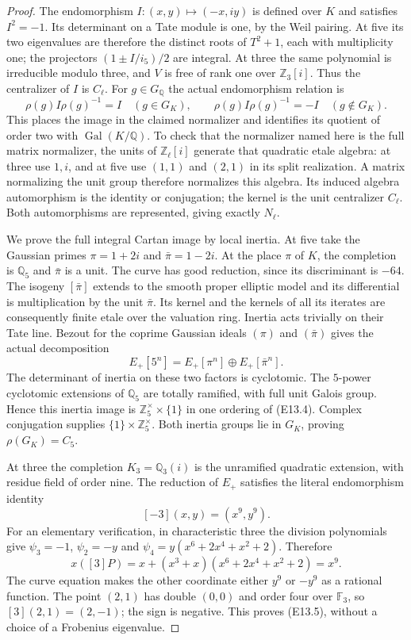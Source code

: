\begin{proof}
The endomorphism $I:(x,y)\mapsto(-x,iy)$ is defined over $K$
and satisfies $I^2=-1$.  Its determinant on a Tate module is one,
by the Weil pairing.  At five its two eigenvalues are therefore
the distinct roots of $T^2+1$, each with multiplicity one; the
projectors $(1\pm I/i_5)/2$ are integral.  At three the same
polynomial is irreducible modulo three, and $V$ is free of rank
one over $\mathbb Z_3[i]$.  Thus the centralizer of $I$ is $C_\ell$.
For $g\in G_{\mathbb Q}$ the actual endomorphism relation is
\[
       \rho(g)I\rho(g)^{-1}=I\quad(g\in G_K),\qquad
       \rho(g)I\rho(g)^{-1}=-I\quad(g\notin G_K).
 \tag{E13.3}
\]
This places the image in the claimed normalizer and identifies
its quotient of order two with $\operatorname{Gal}(K/\mathbb Q)$.
To check that the normalizer named here is the full matrix
normalizer, the units of $\mathbb Z_\ell[i]$ generate that
quadratic etale algebra: at three use $1,i$, and at five use
$(1,1)$ and $(2,1)$ in its split realization.
A matrix normalizing the unit group therefore normalizes this
algebra.  Its induced algebra automorphism is the identity or
conjugation; the kernel is the unit centralizer $C_\ell$.
Both automorphisms are represented, giving exactly $N_\ell$.

We prove the full integral Cartan image by local inertia.
At five take the Gaussian primes $\pi=1+2i$ and
$\bar\pi=1-2i$.  At the place $\pi$ of $K$, the completion is
$\mathbb Q_5$ and $\bar\pi$ is a unit.  The curve has good
reduction, since its discriminant is $-64$.  The isogeny
$[\bar\pi]$ extends to the smooth proper elliptic model and its
differential is multiplication by the unit $\bar\pi$.
Its kernel and the kernels of all its iterates are consequently
finite etale over the valuation ring.  Inertia acts trivially on
their Tate line.  Bezout for the coprime Gaussian ideals
$(\pi)$ and $(\bar\pi)$ gives the actual decomposition
\[
 E_+[5^n]=E_+[\pi^n]\oplus E_+[\bar\pi^n].
 \tag{E13.4}
\]
The determinant of inertia on these two factors is cyclotomic.
The $5$-power cyclotomic extensions of $\mathbb Q_5$ are totally
ramified, with full unit Galois group.  Hence this inertia image
is $\mathbb Z_5^\times\times\{1\}$ in one ordering of (E13.4).
Complex conjugation supplies $\{1\}\times\mathbb Z_5^\times$.
Both inertia groups lie in $G_K$, proving $\rho(G_K)=C_5$.

At three the completion $K_3=\mathbb Q_3(i)$ is the unramified
quadratic extension, with residue field of order nine.  The
reduction of $E_+$ satisfies the literal endomorphism identity
\[
          [-3](x,y)=(x^9,y^9).
 \tag{E13.5}
\]
For an elementary verification, in characteristic three the
division polynomials give $\psi_3=-1$, $\psi_2=-y$ and
$\psi_4=y(x^6+2x^4+x^2+2)$.  Therefore
\[
 x([3]P)=x+(x^3+x)(x^6+2x^4+x^2+2)=x^9.
\]
The curve equation makes the other coordinate either $y^9$
or $-y^9$ as a rational function.  The point $(2,1)$ has double
$(0,0)$ and order four over $\mathbb F_3$, so $[3](2,1)=(2,-1)$;
the sign is negative.  This proves (E13.5), without a choice of
a Frobenius eigenvalue.


\end{proof}
